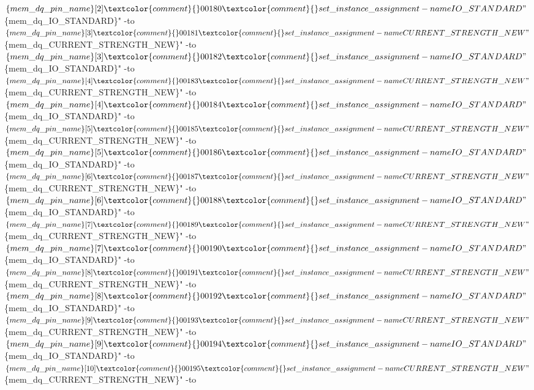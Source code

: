 \begin{DoxyCode}
      $\{mem\_dq\_pin\_name\}[2]\textcolor{comment}{}
00180 \textcolor{comment}{}set\_instance\_assignment -name IO\_STANDARD "$\{mem\_dq\_IO\_STANDARD\}" -to $\{mem\_dq\_pin\_name\}[3]\textcolor{comment}{}
00181 \textcolor{comment}{}set\_instance\_assignment -name CURRENT\_STRENGTH\_NEW "$\{mem\_dq\_CURRENT\_STRENGTH\_NEW\}" -to 
      $\{mem\_dq\_pin\_name\}[3]\textcolor{comment}{}
00182 \textcolor{comment}{}set\_instance\_assignment -name IO\_STANDARD "$\{mem\_dq\_IO\_STANDARD\}" -to $\{mem\_dq\_pin\_name\}[4]\textcolor{comment}{}
00183 \textcolor{comment}{}set\_instance\_assignment -name CURRENT\_STRENGTH\_NEW "$\{mem\_dq\_CURRENT\_STRENGTH\_NEW\}" -to 
      $\{mem\_dq\_pin\_name\}[4]\textcolor{comment}{}
00184 \textcolor{comment}{}set\_instance\_assignment -name IO\_STANDARD "$\{mem\_dq\_IO\_STANDARD\}" -to $\{mem\_dq\_pin\_name\}[5]\textcolor{comment}{}
00185 \textcolor{comment}{}set\_instance\_assignment -name CURRENT\_STRENGTH\_NEW "$\{mem\_dq\_CURRENT\_STRENGTH\_NEW\}" -to 
      $\{mem\_dq\_pin\_name\}[5]\textcolor{comment}{}
00186 \textcolor{comment}{}set\_instance\_assignment -name IO\_STANDARD "$\{mem\_dq\_IO\_STANDARD\}" -to $\{mem\_dq\_pin\_name\}[6]\textcolor{comment}{}
00187 \textcolor{comment}{}set\_instance\_assignment -name CURRENT\_STRENGTH\_NEW "$\{mem\_dq\_CURRENT\_STRENGTH\_NEW\}" -to 
      $\{mem\_dq\_pin\_name\}[6]\textcolor{comment}{}
00188 \textcolor{comment}{}set\_instance\_assignment -name IO\_STANDARD "$\{mem\_dq\_IO\_STANDARD\}" -to $\{mem\_dq\_pin\_name\}[7]\textcolor{comment}{}
00189 \textcolor{comment}{}set\_instance\_assignment -name CURRENT\_STRENGTH\_NEW "$\{mem\_dq\_CURRENT\_STRENGTH\_NEW\}" -to 
      $\{mem\_dq\_pin\_name\}[7]\textcolor{comment}{}
00190 \textcolor{comment}{}set\_instance\_assignment -name IO\_STANDARD "$\{mem\_dq\_IO\_STANDARD\}" -to $\{mem\_dq\_pin\_name\}[8]\textcolor{comment}{}
00191 \textcolor{comment}{}set\_instance\_assignment -name CURRENT\_STRENGTH\_NEW "$\{mem\_dq\_CURRENT\_STRENGTH\_NEW\}" -to 
      $\{mem\_dq\_pin\_name\}[8]\textcolor{comment}{}
00192 \textcolor{comment}{}set\_instance\_assignment -name IO\_STANDARD "$\{mem\_dq\_IO\_STANDARD\}" -to $\{mem\_dq\_pin\_name\}[9]\textcolor{comment}{}
00193 \textcolor{comment}{}set\_instance\_assignment -name CURRENT\_STRENGTH\_NEW "$\{mem\_dq\_CURRENT\_STRENGTH\_NEW\}" -to 
      $\{mem\_dq\_pin\_name\}[9]\textcolor{comment}{}
00194 \textcolor{comment}{}set\_instance\_assignment -name IO\_STANDARD "$\{mem\_dq\_IO\_STANDARD\}" -to $\{mem\_dq\_pin\_name\}[10]\textcolor{comment}{}
00195 \textcolor{comment}{}set\_instance\_assignment -name CURRENT\_STRENGTH\_NEW "$\{mem\_dq\_CURRENT\_STRENGTH\_NEW\}" -to 

\end{DoxyCode}
